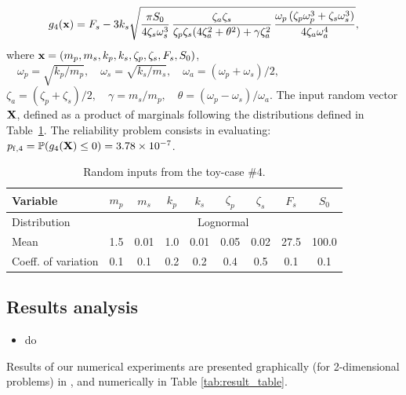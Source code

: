 \begin{equation}
    g_4({\bf x}) = F_s - 3 k_s \sqrt{\frac{\pi S_0}{4 \zeta_s \omega_s^3} \, \frac{\zeta_a \zeta_s}{\zeta_p \zeta_s (4 \zeta_a^2 + \theta^2) + \gamma \zeta_a^2} \, \frac{\omega_p \, (\zeta_p \omega_p^3 + \zeta_s \omega_s^3)}{4 \zeta_a \omega_a^4}},
\end{equation}
where ${\bf x} = \left(m_p, m_s, k_p, k_s, \zeta_p, \zeta_s, F_s, S_0\right)$,  
$\quad \omega_p=\sqrt{k_p/m_p}, \quad \omega_s=\sqrt{k_s/m_s}, \quad \omega_a = (\omega_p + \omega_s)/2, \quad $
$\zeta_a = (\zeta_p + \zeta_s)/2, \quad \gamma = m_s/m_p, \quad \theta= (\omega_p-\omega_s)/\omega_a$. 
The input random vector ${\bf X}$, defined as a product of marginals following the distributions defined in Table~\ref{tab:oscillator}. 
The reliability problem consists in evaluating: $p_{\mathrm{f}, 4} = \mathbb{P} ( g_4({\bf X}) \leq 0 ) =  3.78 \times 10^{-7}$.

\begin{table}[h]
\centering
\begin{tabular}{ lcccccccc }
    \hline
    Variable            & $m_p$ & $m_s$ & $k_p$ & $k_s$ & $\zeta_p$ & $\zeta_s$ & $F_s$ & $S_0$ \\
    \hline          
    Distribution        &  \multicolumn{8}{c}{Lognormal} \\ 
    Mean                & 1.5 & 0.01 & 1.0 & 0.01 & 0.05 & 0.02 & 27.5 & 100.0\\ 
    Coeff. of variation & 0.1 & 0.1 & 0.2 & 0.2 & 0.4 & 0.5 & 0.1 & 0.1\\
    \hline
\end{tabular}
\caption{Random inputs from the toy-case \#4.}
\label{tab:oscillator}
\end{table}

\subsection{Results analysis}

\begin{itemize}
    \item do
\end{itemize}

Results of our numerical experiments are presented graphically (for 2-dimensional problems) in , and numerically in Table \ref{tab:result_table}. 


